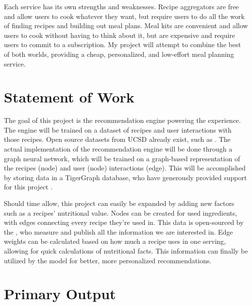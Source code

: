 \documentclass{common/ucsdreport}
\begin{document}
Each service has its own strengths and weaknesses. Recipe aggregators are free and allow users to cook whatever they want, but require users to do all the work of finding recipes and building out meal plans. Meal kits are convenient and allow users to cook without having to think about it, but are expensive and require users to commit to a subscription. My project will attempt to combine the best of both worlds, providing a cheap, personalized, and low-effort meal planning service.

\section{Statement of Work}

The goal of this project is the recommendation engine powering the experience. The engine will be trained on a dataset of recipes and user interactions with those recipes. Open source datasets from UCSD already exist, such as \citet{recipegen}. The actual implementation of the recommendation engine will be done through a graph neural network, which will be trained on a graph-based representation of the recipes (node) and user (node) interactions (edge). This will be accomplished by storing data in a TigerGraph database, who have generously provided support for this project \citep{tigergraph}.

Should time allow, this project can easily be expanded by adding new factors such as a recipes' nutritional value. Nodes can be created for used ingredients, with edges connecting every recipe they're used in. This data is open-sourced by the \citeauthor{fooddata}, who measure and publish all the information we are interested in. Edge weights can be calculated based on how much a recipe uses in one serving, allowing for quick calculations of nutritional facts. This information can finally be utilized by the model for better, more personalized recommendations.


\section{Primary Output}
\end{document}
